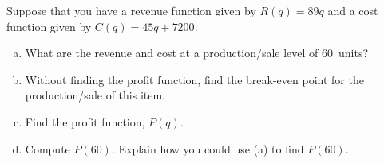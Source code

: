 \documentclass[11pt,letterpaper]{article}
\begin{document}
\newpage



 Suppose that you have a revenue function given by $R(q)= 89q$ and a cost function given by $C(q)= 45q + 7200$. 
	\begin{enumerate}[(a)]
	\item What are the revenue and cost at a production/sale level of 60~units?
	\item Without finding the profit function, find the break-even point for the production/sale of this item.
	\item Find the profit function, $P(q)$.
	\item Compute $P(60)$. Explain how you could use (a) to find $P(60)$. 
	\end{enumerate}
\end{document}
